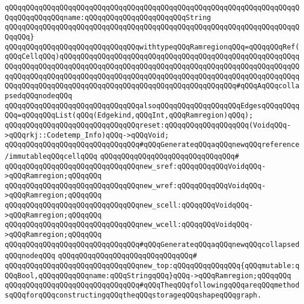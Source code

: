 \verb|qQQqqQQqqQQqqQQqqQQqqQQqqQQqqQQqqQQqqQQqqQQqqQQqqQQqqQQqqQQqqQQqqQQqqQQqqQQqqQQqqQQqname:qQQqqQQqqQQqqQQqqQQqqQQqString|\newline
\verb|qQQqqQQqqQQqqQQqqQQqqQQqqQQqqQQqqQQqqQQqqQQqqQQqqQQqqQQqqQQqqQQqqQQqqQQqqQQq}|\newline
\newline
\verb|qQQqqQQqqQQqqQQqqQQqqQQqqQQqqQQqwithtypeqQQqRamregionqQQq=qQQqqQQqRef(qQQqCellqQQq)qQQqqQQqqQQqqQQqqQQqqQQqqQQqqQQqqQQqqQQqqQQqqQQqqQQqqQQqqQQqqQQqqQQqqQQqqQQqqQQqqQQqqQQqqQQqqQQqqQQqqQQqqQQqqQQqqQQqqQQqqQQqqQQqqQQqqQQqqQQqqQQqqQQqqQQqqQQqqQQqqQQqqQQqqQQqqQQqqQQqqQQqqQQqqQQqqQQqqQQqqQQqqQQqqQQqqQQqqQQqqQQqqQQqqQQqqQQqqQQqqQQqqQQqqQQq#qQQqAqQQqcollapsedqQQqnodeqQQq|\newline
\verb|qQQqqQQqqQQqqQQqqQQqqQQqqQQqqQQqalsoqQQqqQQqqQQqqQQqqQQqEdgesqQQqqQQqqQQq=qQQqqQQqList(qQQq(Edgekind,qQQqInt,qQQqRamregion)qQQq);|\newline
\newline
\verb|qQQqqQQqqQQqqQQqqQQqqQQqqQQqqQQqreset:qQQqqQQqqQQqqQQqqQQq(VoidqQQq->qQQqrkj::Codetemp_Info)qQQq->qQQqVoid;|\newline
\newline
\verb|qQQqqQQqqQQqqQQqqQQqqQQqqQQqqQQq#qQQqGenerateqQQqaqQQqnewqQQqreference/immutableqQQqcellqQQq|\newline
\verb|qQQqqQQqqQQqqQQqqQQqqQQqqQQqqQQq#|\newline
\verb|qQQqqQQqqQQqqQQqqQQqqQQqqQQqqQQqnew_sref:qQQqqQQqqQQqVoidqQQq->qQQqRamregion;qQQqqQQq|\newline
\verb|qQQqqQQqqQQqqQQqqQQqqQQqqQQqqQQqnew_wref:qQQqqQQqqQQqVoidqQQq->qQQqRamregion;qQQqqQQq|\newline
\verb|qQQqqQQqqQQqqQQqqQQqqQQqqQQqqQQqnew_scell:qQQqqQQqVoidqQQq->qQQqRamregion;qQQqqQQq|\newline
\verb|qQQqqQQqqQQqqQQqqQQqqQQqqQQqqQQqnew_wcell:qQQqqQQqVoidqQQq->qQQqRamregion;qQQqqQQq|\newline
\newline
\verb|qQQqqQQqqQQqqQQqqQQqqQQqqQQqqQQq#qQQqGenerateqQQqaqQQqnewqQQqcollapsedqQQqnodeqQQq|\newline
\verb|qQQqqQQqqQQqqQQqqQQqqQQqqQQqqQQq#|\newline
\verb|qQQqqQQqqQQqqQQqqQQqqQQqqQQqqQQqnew_top:qQQqqQQqqQQqqQQq{qQQqmutable:qQQqBool,qQQqqQQqqQQqname:qQQqStringqQQq}qQQq->qQQqRamregion;qQQqqQQq|\newline
\newline
\newline
\verb|qQQqqQQqqQQqqQQqqQQqqQQqqQQqqQQq#qQQqTheqQQqfollowingqQQqareqQQqmethodsqQQqforqQQqconstructingqQQqtheqQQqstorageqQQqshapeqQQqgraph.|\newline
